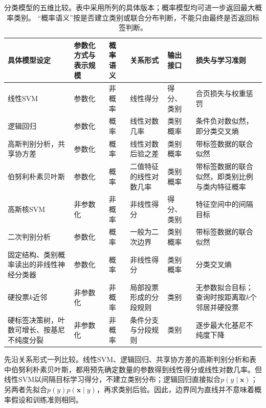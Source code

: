 \begin{table}[htbp]
  \centering
  \footnotesize
  \setlength{\tabcolsep}{4pt}
  \renewcommand{\arraystretch}{1.25}
  \begin{tabularx}{\linewidth}{@{}>{\raggedright\arraybackslash}p{28mm}>{\raggedright\arraybackslash}p{16mm}>{\raggedright\arraybackslash}p{11mm}>{\raggedright\arraybackslash}p{23mm}>{\raggedright\arraybackslash}p{22mm}>{\raggedright\arraybackslash}X@{}}
    \toprule
    \textbf{具体模型设定} & \textbf{参数化方式与表示规模} & \textbf{概率语义} & \textbf{关系形式} & \textbf{输出接口} & \textbf{损失与学习准则} \\
    \midrule
    线性SVM & 参数化 & 非概率 & 线性得分 & 得分、类别 & 合页损失与权重惩罚 \\
    逻辑回归 & 参数化 & 概率 & 线性对数几率 & 类别概率 & 条件负对数似然，即分类交叉熵 \\
    高斯判别分析，共享协方差 & 参数化 & 概率 & 线性对数后验之差 & 类别概率 & 带标签数据的联合似然 \\
    伯努利朴素贝叶斯 & 参数化 & 概率 & 二值特征的线性对数几率 & 类别概率 & 带标签数据的联合似然，即类别比例与类内特征概率 \\
    高斯核SVM & 非参数化 & 非概率 & 非线性得分 & 得分、类别 & 特征空间中的间隔目标 \\
    二次判别分析 & 参数化 & 概率 & 一般为二次边界 & 类别概率 & 带标签数据的联合似然 \\
    固定结构、类别概率读出的非线性神经分类器 & 参数化 & 概率 & 非线性得分 & 类别概率 & 分类交叉熵 \\
    硬投票$k$近邻 & 非参数化 & 非概率 & 局部投票形成的分段规则 & 类别 & 无参数拟合目标；查询时按距离取$k$个邻居并硬投票 \\
    硬标签决策树，叶数可增长、按基尼不纯度分裂 & 非参数化 & 非概率 & 条件分支与分段规则 & 类别 & 逐步最大化基尼不纯度下降 \\
    \bottomrule
  \end{tabularx}
  \caption{分类模型的五维比较。表中采用所列的具体版本；概率模型均可进一步返回最大概率类别。
  “概率语义”按是否建立类别或联合分布判断，不能只由最终是否返回标签判断。}
  \label{tab:models-classifiers}
\end{table}
\FloatBarrier

先沿关系形式一列比较。线性SVM、逻辑回归、共享协方差的高斯判别分析和表中伯努利朴素贝叶斯，都用预先确定数量的参数得到线性得分或线性对数几率。但线性SVM以间隔目标学习得分，不建立类别分布；逻辑回归直接拟合$p(y\mid\bm x)$；另两者先拟合$p(y)p(\bm x\mid y)$，再求类别后验。因此，边界同为直线并不意味着概率假设和训练准则相同。

